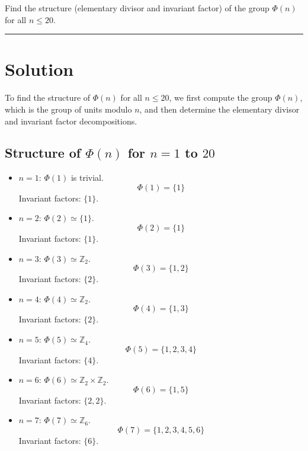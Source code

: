 \documentclass[12pt]{amsart}
\theoremstyle{definition}
\numberwithin{equation}{section}
\newcommand{\Z}{\mathbb{Z}}
\begin{document}
\newpage
\begin{exercise}{8} Find the structure (elementary divisor and invariant factor) of the group \(\Phi(n)\) for all \(n \leq 20\). 

    \noindent\rule{\linewidth}{1pt}

    \section*{Solution}

    To find the structure of \(\Phi(n)\) for all \(n \leq 20\), we first compute the group \(\Phi(n)\), which is the group of units modulo \(n\), and then determine the elementary divisor and invariant factor decompositions.

    \subsection*{Structure of \(\Phi(n)\) for \(n = 1\) to \(20\)}
    
    \begin{itemize}
        \item \(n = 1\): \(\Phi(1)\) is trivial.
        \[
        \Phi(1) = \{1\}
        \]
        Invariant factors: \(\{1\}\).

        \item \(n = 2\): \(\Phi(2) \simeq \{1\}\).
        \[
        \Phi(2) = \{1\}
        \]
        Invariant factors: \(\{1\}\).

        \item \(n = 3\): \(\Phi(3) \simeq \Z_2\).
        \[
        \Phi(3) = \{1, 2\}
        \]
        Invariant factors: \(\{2\}\).

        \item \(n = 4\): \(\Phi(4) \simeq \Z_2\).
        \[
        \Phi(4) = \{1, 3\}
        \]
        Invariant factors: \(\{2\}\).

        \item \(n = 5\): \(\Phi(5) \simeq \Z_4\).
        \[
        \Phi(5) = \{1, 2, 3, 4\}
        \]
        Invariant factors: \(\{4\}\).

        \item \(n = 6\): \(\Phi(6) \simeq \Z_2 \times \Z_2\).
        \[
        \Phi(6) = \{1, 5\}
        \]
        Invariant factors: \(\{2, 2\}\).

        \item \(n = 7\): \(\Phi(7) \simeq \Z_6\).
        \[
        \Phi(7) = \{1, 2, 3, 4, 5, 6\}
        \]
        Invariant factors: \(\{6\}\).


\end{itemize}
\end{exercise}
\end{document}
